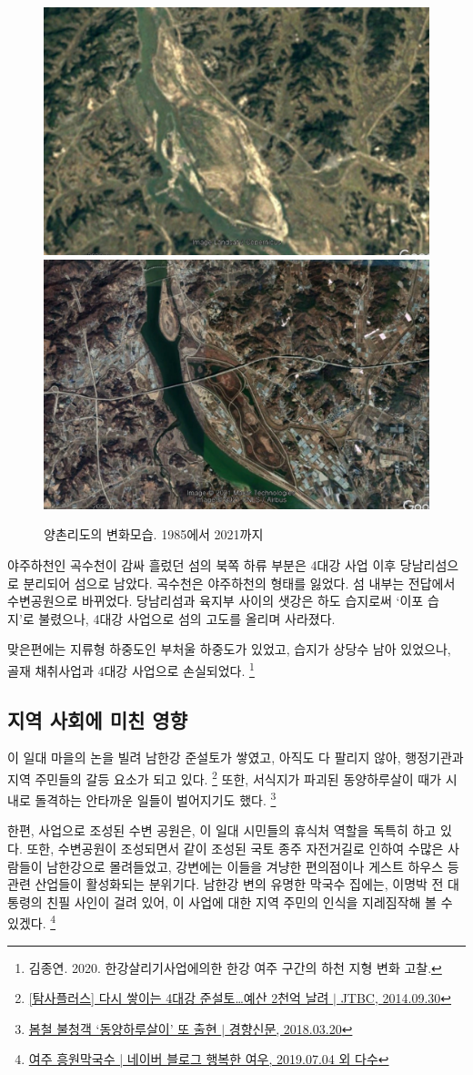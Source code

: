 \begin{figure}[ht]
    \centering
    \includegraphics[width=.45\textwidth]{img/양촌리 1985.jpg}
    \includegraphics[width=.45\textwidth]{img/양촌리 2021.jpg}
    \caption{양촌리도의 변화모습. 1985에서 2021까지 }
    \label{fig:my_labe613}
\end{figure}


야주하천인 곡수천이 감싸 흘렀던 섬의 북쪽 하류 부분은 4대강 사업 이후 당남리섬으로 분리되어 섬으로 남았다. 
곡수천은 야주하천의 형태를 잃었다. 섬 내부는 전답에서 수변공원으로 바뀌었다.
당남리섬과 육지부 사이의 샛강은 하도 습지로써 `이포 습지'로 불렸으나, 4대강 사업으로 섬의 고도를 올리며 사라졌다.

맞은편에는 지류형 하중도인 부처울 하중도가 있었고, 습지가 상당수 남아 있었으나, 골재 채취사업과 4대강 사업으로 손실되었다.
\footnote{김종연. 2020. 한강살리기사업에의한 한강 여주 구간의 하천 지형 변화 고찰.}

\subsection{지역 사회에 미친 영향}
이 일대 마을의 논을 빌려 남한강 준설토가 쌓였고,
아직도 다 팔리지 않아, 행정기관과 지역 주민들의 갈등 요소가 되고 있다.
\footnote{\href{https://news.jtbc.joins.com/article/article.aspx?news_id=NB10593178}{[탐사플러스] 다시 쌓이는 4대강 준설토…예산 2천억 날려 $|$ JTBC, 2014.09.30}}
또한, 서식지가 파괴된 동양하루살이 때가 시내로 돌격하는 안타까운 일들이 벌어지기도 했다.
\footnote{\href{http://news.khan.co.kr/kh_news/khan_art_view.html?artid=201803201448001&code=620109}{봄철 불청객 `동양하루살이' 또 출현 $|$ 경향신문, 2018.03.20}}

한편, 사업으로 조성된 수변 공원은, 이 일대 시민들의 휴식처 역할을 독특히 하고 있다.
또한, 수변공원이 조성되면서 같이 조성된 국토 종주 자전거길로 인하여 수많은 사람들이 남한강으로 몰려들었고,
강변에는 이들을 겨냥한 편의점이나 게스트 하우스 등 관련 산업들이 활성화되는 분위기다.
남한강 변의 유명한 막국수 집에는, 이명박 전 대통령의 친필 사인이 걸려 있어,
이 사업에 대한 지역 주민의 인식을 지레짐작해 볼 수 있겠다.
\footnote{\href{https://blog.naver.com/lovelyiii/221577715597}{여주 흥원막국수 | 네이버 블로그 행복한 여우, 2019.07.04 외 다수}}

